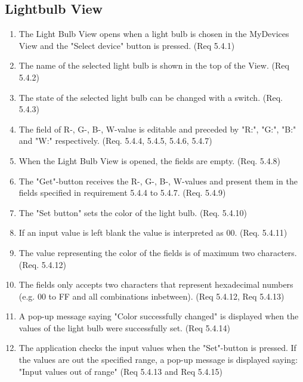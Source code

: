 \documentclass[a4paper]{article}
\newlength{\testlabellength}
\newenvironment{testlist}{\begin{enumerate}[label=\bfseries Test \thesubsection.\arabic* , labelindent=0pt, labelwidth=\testlabellength , leftmargin=2cm]}{\end{enumerate}}
\begin{document}
\begin{appendices}
\subsection{Lightbulb View}
\begin{testlist}
	\item The Light Bulb View opens when a light bulb is chosen in the MyDevices View and the "Select device" button is pressed. (Req 5.4.1)
	\item The name of the selected light bulb is shown in the top of the View. (Req 5.4.2)
  
    \item The state of the selected light bulb can be changed with a switch. (Req. 5.4.3)
    
    \item The field of R-, G-, B-, W-value is editable and preceded by "R:", "G:", "B:" and "W:" respectively. (Req. 5.4.4, 5.4.5, 5.4.6, 5.4.7) 

    
	\item When the Light Bulb View is opened, the fields are empty. (Req. 5.4.8)

	\item The "Get"-button receives the R-, G-, B-, W-values and present them in the fields specified in requirement 5.4.4 to 5.4.7. (Req. 5.4.9)

	\item The "Set button" sets the color of the light bulb.	(Req. 5.4.10)

	\item If an input value is left blank the value is interpreted as 00. (Req. 5.4.11)    
    
    
    \item The value representing the color of the fields is of maximum two characters. (Req. 5.4.12)
    
    \item The fields only accepts two characters that represent hexadecimal numbers (e.g. 00 to FF and all combinations inbetween). (Req 5.4.12, Req 5.4.13)
    
    \item A pop-up message saying "Color successfully changed" is displayed when the values of the light bulb were successfully set. (Req 5.4.14)
    
    \item The application checks the input values when the "Set"-button is pressed. If the values are out the specified range, a pop-up message is displayed saying: "Input values out of range" (Req 5.4.13 and Req 5.4.15)
    

\end{testlist}
\end{appendices}
\end{document}
